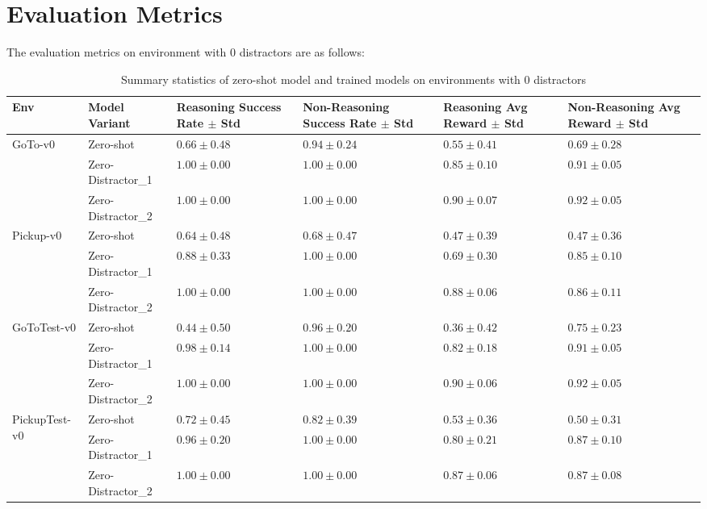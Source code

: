 \documentclass[11pt,a4paper]{article}
\begin{document}
\section{Evaluation Metrics}
\label{app:F}
The evaluation metrics on environment with 0 distractors are as follows:
\begin{table}[htbp]
\centering
\scriptsize
\begin{tabularx}{\linewidth}{%
    l l
    >{\centering\arraybackslash}X 
    >{\centering\arraybackslash}X 
    >{\centering\arraybackslash}X 
    >{\centering\arraybackslash}X }
\toprule
\textbf{Env} & \textbf{Model Variant} 
& \textbf{Reasoning Success Rate $\pm$ Std} 
& \textbf{Non-Reasoning Success Rate $\pm$ Std} 
& \textbf{Reasoning Avg Reward $\pm$ Std} 
& \textbf{Non-Reasoning Avg Reward $\pm$ Std} \\
\midrule
\multirow{3}{*}{GoTo-v0} 
    & Zero-shot                & $0.66\pm0.48$ & $0.94\pm0.24$ & $0.55\pm0.41$ & $0.69\pm0.28$ \\
    & Zero-Distractor\_1      & $1.00\pm0.00$ & $1.00\pm0.00$ & $0.85\pm0.10$ & $0.91\pm0.05$ \\
    & Zero-Distractor\_2      & $1.00\pm0.00$ & $1.00\pm0.00$ & $0.90\pm0.07$ & $0.92\pm0.05$ \\
\midrule
\multirow{3}{*}{Pickup-v0} 
    & Zero-shot                & $0.64\pm0.48$ & $0.68\pm0.47$ & $0.47\pm0.39$ & $0.47\pm0.36$ \\
    & Zero-Distractor\_1      & $0.88\pm0.33$ & $1.00\pm0.00$ & $0.69\pm0.30$ & $0.85\pm0.10$ \\
    & Zero-Distractor\_2      & $1.00\pm0.00$ & $1.00\pm0.00$ & $0.88\pm0.06$ & $0.86\pm0.11$ \\
\midrule
\multirow{3}{*}{GoToTest-v0} 
    & Zero-shot                & $0.44\pm0.50$ & $0.96\pm0.20$ & $0.36\pm0.42$ & $0.75\pm0.23$ \\
    & Zero-Distractor\_1      & $0.98\pm0.14$ & $1.00\pm0.00$ & $0.82\pm0.18$ & $0.91\pm0.05$ \\
    & Zero-Distractor\_2      & $1.00\pm0.00$ & $1.00\pm0.00$ & $0.90\pm0.06$ & $0.92\pm0.05$ \\
\midrule
\multirow{3}{*}{PickupTest-v0} 
    & Zero-shot                & $0.72\pm0.45$ & $0.82\pm0.39$ & $0.53\pm0.36$ & $0.50\pm0.31$ \\
    & Zero-Distractor\_1      & $0.96\pm0.20$ & $1.00\pm0.00$ & $0.80\pm0.21$ & $0.87\pm0.10$ \\
    & Zero-Distractor\_2      & $1.00\pm0.00$ & $1.00\pm0.00$ & $0.87\pm0.06$ & $0.87\pm0.08$ \\
\bottomrule
\end{tabularx}
\caption{Summary statistics of zero-shot model and trained models on environments with 0 distractors}
\label{tab:performance0}
\end{table}
\end{document}
